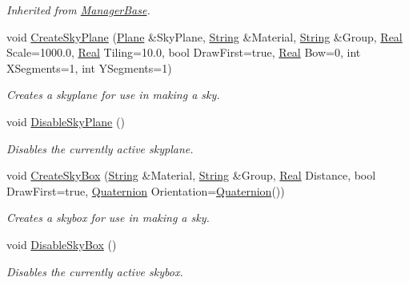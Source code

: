 \begin{DoxyCompactItemize}
\begin{DoxyCompactList}\small\item\em Inherited from \hyperlink{classphys_1_1ManagerBase}{ManagerBase}. \item\end{DoxyCompactList}\item 
void \hyperlink{classphys_1_1SceneManager_ab7defb48661e42614f097c9e654cb79a}{CreateSkyPlane} (\hyperlink{classphys_1_1Plane}{Plane} \&SkyPlane, \hyperlink{namespacephys_aa03900411993de7fbfec4789bc1d392e}{String} \&Material, \hyperlink{namespacephys_aa03900411993de7fbfec4789bc1d392e}{String} \&Group, \hyperlink{namespacephys_af7eb897198d265b8e868f45240230d5f}{Real} Scale=1000.0, \hyperlink{namespacephys_af7eb897198d265b8e868f45240230d5f}{Real} Tiling=10.0, bool DrawFirst=true, \hyperlink{namespacephys_af7eb897198d265b8e868f45240230d5f}{Real} Bow=0, int XSegments=1, int YSegments=1)
\begin{DoxyCompactList}\small\item\em Creates a skyplane for use in making a sky. \item\end{DoxyCompactList}\item 
void \hyperlink{classphys_1_1SceneManager_af5763eedafdd11712b55ee33a11bd2b8}{DisableSkyPlane} ()
\begin{DoxyCompactList}\small\item\em Disables the currently active skyplane. \item\end{DoxyCompactList}\item 
void \hyperlink{classphys_1_1SceneManager_a0adfdec14b8b3c19fd0ce95b0933dc99}{CreateSkyBox} (\hyperlink{namespacephys_aa03900411993de7fbfec4789bc1d392e}{String} \&Material, \hyperlink{namespacephys_aa03900411993de7fbfec4789bc1d392e}{String} \&Group, \hyperlink{namespacephys_af7eb897198d265b8e868f45240230d5f}{Real} Distance, bool DrawFirst=true, \hyperlink{classphys_1_1Quaternion}{Quaternion} Orientation=\hyperlink{classphys_1_1Quaternion}{Quaternion}())
\begin{DoxyCompactList}\small\item\em Creates a skybox for use in making a sky. \item\end{DoxyCompactList}\item 
void \hyperlink{classphys_1_1SceneManager_acb9c87d510955f028db24ce49944a97a}{DisableSkyBox} ()
\begin{DoxyCompactList}\small\item\em Disables the currently active skybox. \item\end{DoxyCompactList}\item 

\end{DoxyCompactItemize}
